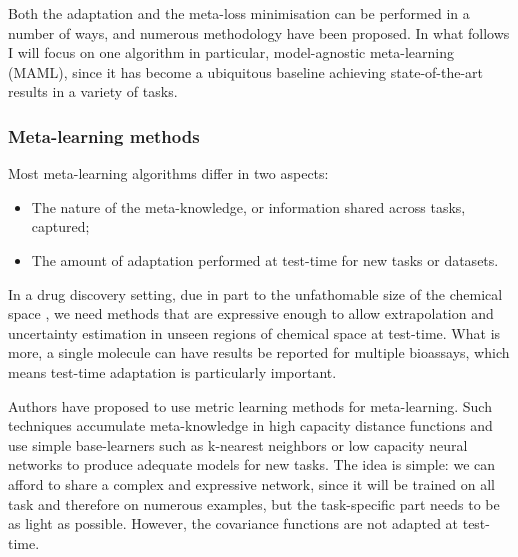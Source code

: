 \documentclass[11pt]{article}
\numberwithin{equation}{subsection}
\begin{document}


Both the adaptation and the meta-loss minimisation can be performed in a number of ways, and numerous methodology have been proposed. In what follows I will focus on one algorithm in particular, model-agnostic meta-learning (MAML), since it has become a ubiquitous baseline achieving state-of-the-art results in a variety of tasks.


\subsubsection{Meta-learning methods}

Most meta-learning algorithms differ in two aspects:
\begin{itemize}
  \item The nature of the meta-knowledge, or information shared across tasks, captured;
  \item The amount of adaptation performed at test-time for new tasks or datasets.
\end{itemize}
In a drug discovery setting, due in part to the unfathomable size of the chemical space \citep{bohacek1996art}, we need methods that are expressive enough to allow extrapolation and uncertainty estimation in unseen regions of chemical space at test-time. What is more, a single molecule can have results be reported for multiple bioassays, which means test-time adaptation is particularly important.

Authors have proposed to use metric learning methods \citep{koch2015siamese, vinyals2016matching, snell2017prototypical, garcia2017few, bertinetto2018meta} for meta-learning.
Such techniques accumulate meta-knowledge in high capacity distance functions and use simple base-learners such as k-nearest neighbors \citep{snell2017prototypical, vinyals2016matching} or low capacity neural networks \citep{garcia2017few} to produce adequate models for new tasks. The idea is simple: we can afford to share a complex and expressive network, since it will be trained on all task and therefore on numerous examples, but the task-specific part needs to be as light as possible.
However, the covariance functions are not adapted at test-time.
\end{document}
